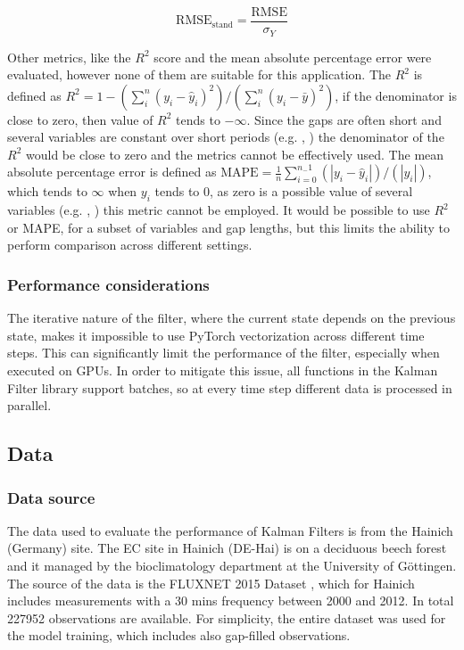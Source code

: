 \documentclass{article}
\let\Oldsubsection\subsection
\renewcommand{\subsection}{\FloatBarrier\Oldsubsection}
\begin{document}
\begin{equation}
    \text{RMSE}_{\text{stand}} = \frac{\text{RMSE}}{\sigma_Y} 
\end{equation}

Other metrics, like the $R^2$ score and the mean absolute percentage error were evaluated, however none of them are suitable for this application. The $R^2$ is defined as $R^2 = 1 - (\sum_{i}^{n} (y_i - \hat{y}_i)^2)/(\sum_{i}^{n} (y_i - \bar{y})^2)$, if the denominator is close to zero, then value of $R^2$ tends to $- \infty$. Since the gaps are often short and several variables are constant over short periods (e.g. , ) the denominator of the $R^2$ would be close to zero and the metrics cannot be effectively used. The mean absolute percentage error is defined as $\text{MAPE} = \frac{1}{n} \sum_{i=0}^{n_-1} (\left| y_i - \hat{y}_i \right|)/(\left| y_i \right|)$, which tends to $\infty$ when $y_i$ tends to 0, as zero is a possible value of several variables (e.g. , ) this metric cannot be employed.
It would be possible to use $R^2$ or MAPE, for a subset of variables and gap lengths, but this limits the ability to perform comparison across different settings. 

\subsubsection{Performance considerations} 

The iterative nature of the filter, where the current state depends on the previous state, makes it impossible to use PyTorch vectorization across different time steps. This can significantly limit the performance of the filter, especially when executed on GPUs. In order to  mitigate this issue, all functions in the Kalman Filter library support batches, so at every time step different data is processed in parallel.


\subsection{Data}

\subsubsection{Data source}

The data used to evaluate the performance of Kalman Filters is from the Hainich (Germany) site. The EC site in Hainich (DE-Hai) is on a deciduous beech forest and it managed by the bioclimatology department at the  University of Göttingen. The source of the data is  the FLUXNET 2015 Dataset \cite{pastorello_fluxnet2015_2020}, which for Hainich includes measurements with a 30 mins frequency between 2000 and 2012. In total 227952 observations are available. For simplicity, the entire dataset was used for the model training, which includes also gap-filled observations.
\end{document}

